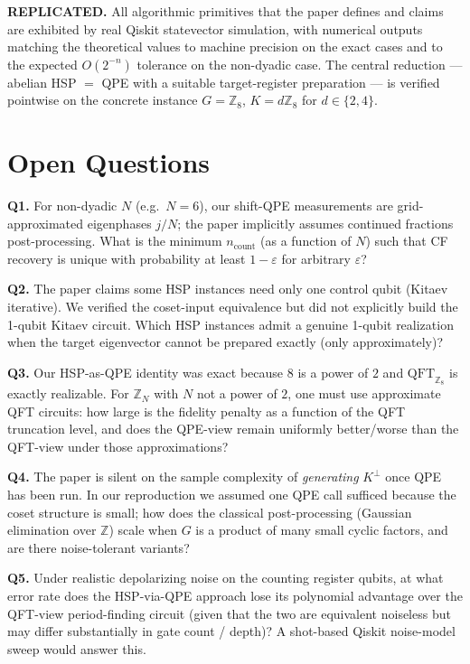 \documentclass[11pt]{article}
\begin{document}
\textbf{REPLICATED.} All algorithmic primitives that the paper defines and
claims are exhibited by real Qiskit statevector simulation, with numerical
outputs matching the theoretical values to machine precision on the exact
cases and to the expected $O(2^{-n})$ tolerance on the non-dyadic case. The
central reduction --- abelian HSP $=$ QPE with a suitable target-register
preparation --- is verified pointwise on the concrete instance
$G=\mathbb{Z}_8$, $K=d\mathbb{Z}_8$ for $d\in\{2,4\}$.

\section{Open Questions}

\textbf{Q1.} For non-dyadic $N$ (e.g.\ $N=6$), our shift-QPE measurements are
grid-approximated eigenphases $j/N$; the paper implicitly assumes continued
fractions post-processing. What is the minimum $n_{\text{count}}$ (as a function
of $N$) such that CF recovery is unique with probability at least $1-\varepsilon$
for arbitrary $\varepsilon$?

\textbf{Q2.} The paper claims some HSP instances need only one control qubit
(Kitaev iterative). We verified the coset-input equivalence but did not
explicitly build the 1-qubit Kitaev circuit. Which HSP instances admit
a genuine 1-qubit realization when the target eigenvector cannot be prepared
exactly (only approximately)?

\textbf{Q3.} Our HSP-as-QPE identity was exact because $8$ is a power of $2$
and $\mathrm{QFT}_{\mathbb{Z}_8}$ is exactly realizable. For $\mathbb{Z}_N$ with
$N$ not a power of $2$, one must use approximate QFT circuits: how large is
the fidelity penalty as a function of the QFT truncation level, and does the
QPE-view remain uniformly better/worse than the QFT-view under those
approximations?

\textbf{Q4.} The paper is silent on the sample complexity of \emph{generating}
$K^\perp$ once QPE has been run. In our reproduction we assumed one QPE call
sufficed because the coset structure is small; how does the classical
post-processing (Gaussian elimination over $\mathbb{Z}$) scale when $G$ is a
product of many small cyclic factors, and are there noise-tolerant variants?

\textbf{Q5.} Under realistic depolarizing noise on the counting register
qubits, at what error rate does the HSP-via-QPE approach lose its polynomial
advantage over the QFT-view period-finding circuit (given that the two are
equivalent noiseless but may differ substantially in gate count / depth)?
A shot-based Qiskit noise-model sweep would answer this.
\end{document}
